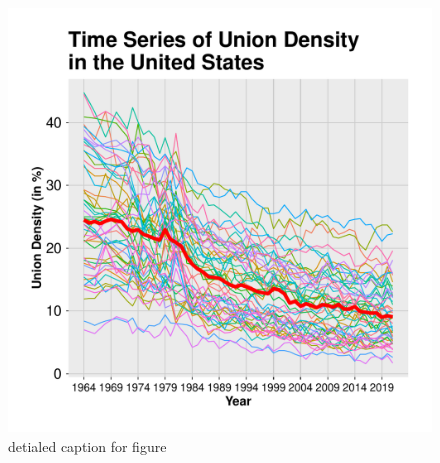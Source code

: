 \documentclass[11pt]{article}\usepackage[]{graphicx}\usepackage[]{xcolor}
\newenvironment{knitrout}{}{} %
\begin{document}
\begin{figure}[h]
\centering
  \begin{minipage}{.8\linewidth}
\begin{knitrout}
\color{fgcolor}

{\centering \includegraphics[width=.8\linewidth]{figure/TimesSeriesUnitedStates-1} 

}


\end{knitrout}
  \caption{detialed caption for figure } 
  \label{fig:usstatesuniondensity}
  \end{minipage}
\end{figure}
\end{document}
